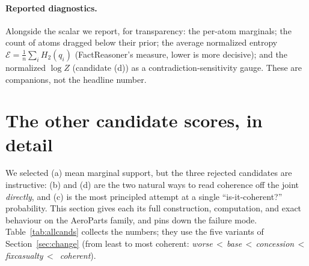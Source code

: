 \documentclass[11pt]{article}
\begin{document}
\paragraph{Reported diagnostics.} Alongside the scalar we report, for transparency:
the per-atom marginals; the count of atoms dragged below their prior; the average
normalized entropy $\mathcal E=\frac1n\sum_i H_2(q_i)$ (FactReasoner's measure, lower is more
decisive); and the normalized $\log Z$ (candidate (d)) as a contradiction-sensitivity gauge.
These are companions, not the headline number.

\section{The other candidate scores, in detail}
\label{sec:others}

We selected (a) mean marginal support, but the three rejected candidates are instructive:
(b) and (d) are the two natural ways to read coherence off the joint \emph{directly}, and
(c) is the most principled attempt at a single ``is-it-coherent?'' probability. This section
gives each its full construction, computation, and exact behaviour on the AeroParts family,
and pins down the failure mode. Table~\ref{tab:allcands} collects the numbers; they use the
five variants of Section~\ref{sec:change} (from least to most coherent:
\emph{worse}\,$<$\,\emph{base}\,$<$\,\emph{concession}\,$<$\,\emph{fixcasualty}\,$<$\,%
\emph{coherent}).
\end{document}
